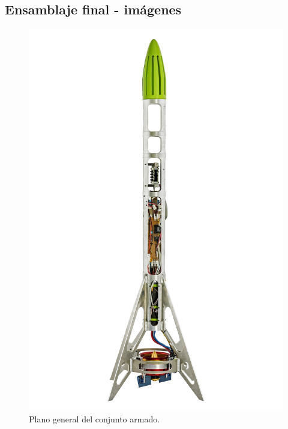 \null\newpage
\clearpage

\subsection{Ensamblaje final - imágenes}

\begin{figure}[htb]
    \centering
    \includegraphics[width=\linewidth]{fig/hq/wide_plane_bonete.jpg}
    \caption{Plano general del conjunto armado.}
    \label{fig:hq/wide_plane_bonete}
\end{figure}

